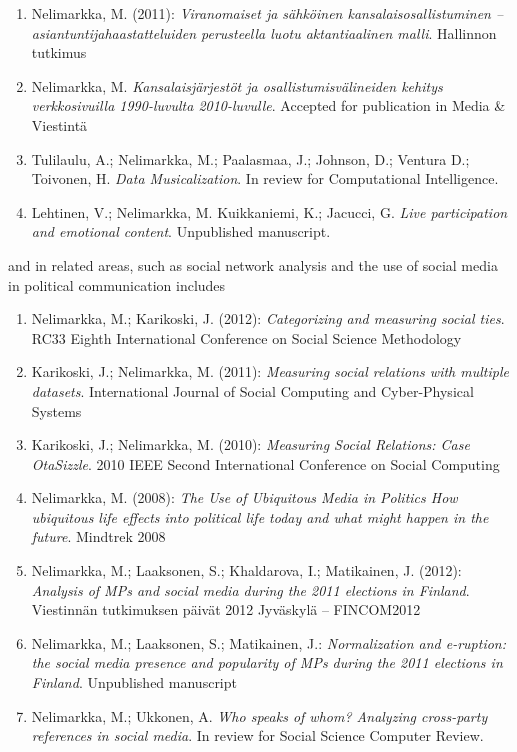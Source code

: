 \documentclass{article}
\begin{document}
\begin{enumerate}
\item Nelimarkka, M. (2011): \textit{Viranomaiset ja sähköinen kansalaisosallistuminen -- asiantuntijahaastatteluiden perusteella luotu aktantiaalinen malli}. Hallinnon tutkimus
\item Nelimarkka, M. \textit{Kansalaisjärjestöt ja osallistumisvälineiden kehitys verkkosivuilla 1990-luvulta 2010-luvulle}. Accepted for publication in Media \& Viestintä
\item Tulilaulu, A.; Nelimarkka, M.; Paalasmaa, J.; Johnson, D.; Ventura D.; Toivonen, H. \textit{Data Musicalization}. In review for Computational Intelligence.
\item Lehtinen, V.; Nelimarkka, M. Kuikkaniemi, K.; Jacucci, G. \textit{Live participation and emotional content}. Unpublished manuscript.
\end{enumerate}

and in related areas, such as social network analysis and the use of social media in political communication includes

\begin{enumerate}
\item Nelimarkka, M.; Karikoski, J. (2012): \textit{Categorizing and measuring social ties}. RC33 Eighth International Conference on Social Science Methodology
\item  Karikoski, J.; Nelimarkka, M. (2011): \textit{Measuring social relations with multiple datasets}. International Journal of Social Computing and Cyber-Physical Systems
\item Karikoski, J.; Nelimarkka, M. (2010): \textit{Measuring Social Relations: Case OtaSizzle}. 2010 IEEE Second International Conference on Social Computing
\item Nelimarkka, M. (2008): \textit{The Use of Ubiquitous Media in Politics How ubiquitous life effects into political life today and what might happen in the future}. Mindtrek 2008
\item Nelimarkka, M.; Laaksonen, S.; Khaldarova, I.; Matikainen, J. (2012): \textit{Analysis of MPs and social media during the 2011 elections in Finland}. Viestinnän tutkimuksen päivät 2012 Jyväskylä – FINCOM2012
\item Nelimarkka, M.; Laaksonen, S.; Matikainen, J.: \textit{Normalization and e-ruption: the social media presence and popularity of MPs during the 2011 elections in Finland}. Unpublished manuscript
\item Nelimarkka, M.; Ukkonen, A. \textit{Who speaks of whom? Analyzing cross-party references in social media}. In review for Social Science Computer Review.
\end{enumerate}
\end{document}
